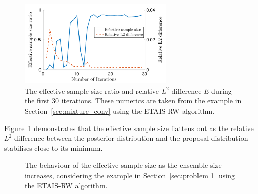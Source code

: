\documentclass[final]{siamltex}
\begin{document}
\begin{figure}[htb]
\centering
\includegraphics[width=0.65\textwidth]{"figures/C1_burnin"}
\caption{The effective sample size ratio and relative $L^2$ difference
$E$ during the first 30 iterations. These numerics are taken from the
example in Section~\ref{sec:mixture_conv} using the ETAIS-RW algorithm.}
\label{fig:neff-burnin}
\end{figure}

Figure~\ref{fig:neff-burnin} demonstrates that the effective sample
size flattens out as the relative $L^2$ difference between the
posterior distribution and the proposal distribution stabilises close
to its minimum.

\begin{figure}[htb]
\centering
{}
\caption{The behaviour of the effective sample size as the ensemble
  size increases, considering the example in Section~\ref{sec:problem 1} using the ETAIS-RW algorithm.}
\label{fig:neff-M}
\end{figure}
\end{document}
